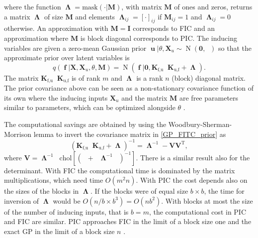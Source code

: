 \documentclass[twoside,11pt]{article}
\DeclareMathOperator{\Kfu}{\mathbf{K}_{f,u}}
\DeclareMathOperator{\Kuf}{\mathbf{K}_{u,f}}
\DeclareMathOperator{\Kuu}{\mathbf{K}_{u,u}}
\DeclareMathOperator{\iKuu}{\mathbf{K}_{u,u}^{-1}}
\DeclareMathOperator{\x}{\mathbf{x}}
\DeclareMathOperator{\f}{\mathbf{f}}
\DeclareMathOperator{\uu}{\mathbf{u}}
\DeclareMathOperator{\LL}{\mathbf{\Lambda}}
\DeclareMathOperator{\N}{N}
\newcommand{\mb}{\mathbf}
\begin{document}
%
where the function $\LL=\mathrm{mask}\left(\cdot|\mb{M}\right)$, with
matrix $\mb{M}$ of ones and zeros, returns a matrix $\LL$ of size
$\mb{M}$ and elements $\LL_{ij} = [\cdot]_{ij}$ if $\mb{M}_{ij} = 1$
and $\LL_{ij} =0$ otherwise.  An approximation with $\mb{M} = \mb{I}$
corresponds to FIC and an approximation where $\mb{M}$ is block
diagonal corresponds to PIC.  The inducing variables are given a
zero-mean Gaussian prior $\uu|\theta,\mb{X}_u\sim \N(\mb{0},\Kuu)$ so
that the approximate prior over latent variables is
%
\begin{equation}
  q(\f | \mb{X}, \mb{X}_{u},\theta,\mb{M}) = \N(\f | \mb{0}, \mb{K}_{\text{f,u}} \iKuu\mb{K}_{\text{u,f}}+\LL).
\label{GP_FITC_prior}
\end{equation}
%
The matrix $\mb{K}_{\text{f,u}} \iKuu\mb{K}_{\text{u,f}}$ is of
rank $m$ and $\LL$ is a rank $n$ (block) diagonal matrix. The prior
covariance above can be seen as a non-stationary covariance function of its
own 
where the inducing inputs $\mb{X}_u$ and the matrix $\mb{M}$ are free
parameters similar to parameters, which can be optimized
alongside $\theta$ \citep{Snelson+Ghahramani:2006,Lawrence:2007}.

The computational savings are obtained by using the
Woodbury-Sherman-Morrison lemma \citep[e.g.][]{Harville:1997} to
invert the covariance matrix in \eqref{GP_FITC_prior} as
%
\begin{equation}\label{Woodbury_eq}
(\mb{K}_{\text{f,u}} \iKuu\mb{K}_{\text{u,f}}+\LL)^{-1} = \LL^{-1} -
\mb{V}\mb{V}^{\text{T}},
\end{equation}
%
where $\mb{V} =\LL^{-1}\Kfu \text{chol}[(\Kuu
+\Kuf\LL^{-1}\Kfu)^{-1}]$. There is a
similar result also for the determinant. With FIC the computational
time is dominated by the matrix multiplications, which need time
$O(m^2n)$. With PIC the cost depends also on the sizes of the blocks
in $\LL$. If the blocks were of equal size $b\times b$, the time for
inversion of $\LL$ would be $O(n/b\times b^3)=O(nb^2)$. With blocks at
most the size of the number of inducing inputs, that is $b=m$, the
computational cost in PIC and FIC are similar. PIC approaches FIC in
the limit of a block size one and the exact GP in the limit of a block
size $n$ \citep{Snelson:2007b}.
\end{document}

